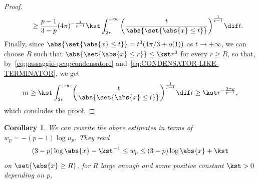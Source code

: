 \documentclass[10pt,a4paper]{amsart}
\numberwithin{equation}{section}
\newtheorem{Corollary}[Theorem]{Corollary}
\begin{document}
\begin{proof}
\begin{gather}
 \qquad{}\geq\frac{p-1}{3-p}(4 \pi)^{-\frac{1}{p-1}}\kst \int_{2r}^{+\infty} \bigg( \frac{t}{\abs{\set{\abs{x} \leq t}}}\bigg)^{\frac{1}{p-1}} \dif t.\label{eq:CONDENSATOR-LIKE-TERMINATOR}
\end{gather}
Finally, since $\abs{\set{\abs{x}\leq t}}= t^3(4\pi/3+o(1))$ as $t\to +\infty$, we can choose $R$ such that $\abs{\set{\abs{x}\leq r}}\leq\kst r^3$ for every $r \geq R$, so that, by~\eqref{eq:passaggio-pcapcondensatore} and~\eqref{eq:CONDENSATOR-LIKE-TERMINATOR}, we get
\[
 m \geq \kst\int_{2r}^{+\infty} \bigg( \frac{t}{\abs{\set{\abs{x} \leq t}}}\bigg)^{\frac{1}{p-1}} \dif t \geq \kst r^{-\frac{3-p}{p-1}},
\]
which concludes the proof. \end{proof}

\begin{Corollary}
 We can rewrite the above estimates in terms of $w_p = -(p-1)\log u_p$. They read
 \[
 (3-p) \log \abs{x} -\kst^{-1} \leq w_p \leq (3-p) \log \abs{x} +\kst
 \]
 on $\set{\abs{x} \geq R}$, for $R$ large enough and some positive constant $\kst>0$ depending on $p$.
\end{Corollary}
\end{document}
